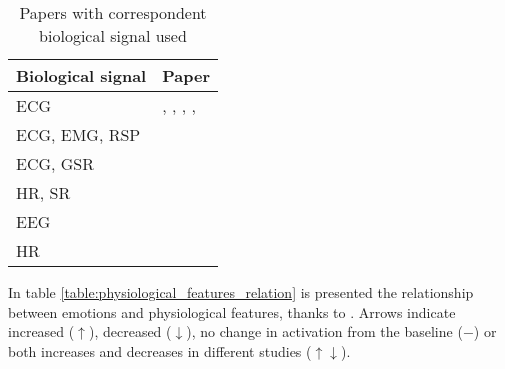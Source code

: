 \begin{table}[h!]
	\centering
	\begin{tabular}{|l|l|}
		\hline
		Biological signal & Paper\\ [0.5ex] 
		\hline \hline ECG & \cite{dissanayake2019ensemble}, \cite{hsu2017automatic},  \cite{naji2014classification}, \cite{naji2015emotion}, \cite{cai2009research}  \\ 
		\hline ECG, EMG, RSP & \cite{kim2008emotion} \\
		\hline ECG, GSR & \cite{goshvarpour2017accurate} \\ 
		\hline HR, SR & \cite{yoo2005neural} \\
		\hline EEG & \cite{sourina2012real} \\
		\hline HR & \cite{nardelli2015recognizing} \\
		\hline
	\end{tabular}
	\caption{Papers with correspondent biological signal used}
	\label{table:biological_signals}
\end{table}
\newpage
In table \ref{table:physiological_features_relation} is presented the relationship between emotions and physiological features, thanks to \cite{shu2018review}. Arrows indicate increased ($\uparrow$), decreased ($\downarrow$), no change in activation from the baseline ($-$) or both increases and decreases in different studies ($\uparrow\downarrow$).

